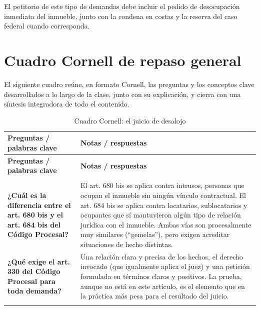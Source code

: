 \documentclass[12pt,oneside]{book}
\begin{document}
El petitorio de este tipo de demandas debe incluir el pedido de desocupación inmediata del inmueble, junto con la condena en costas y la reserva del caso federal cuando corresponda.

\chapter{Cuadro Cornell de repaso general}

El siguiente cuadro reúne, en formato Cornell, las preguntas y los conceptos clave desarrollados a lo largo de la clase, junto con su explicación, y cierra con una síntesis integradora de todo el contenido.

\begin{longtable}{
    >{\raggedright\arraybackslash}p{}
    >{\raggedright\arraybackslash}p{}
}
\caption{Cuadro Cornell: el juicio de desalojo} \\
\toprule
\textbf{Preguntas / palabras clave} & \textbf{Notas / respuestas} \\
\midrule
\endfirsthead

\toprule
\textbf{Preguntas / palabras clave} & \textbf{Notas / respuestas} \\
\midrule
\endhead

\midrule
\multicolumn{2}{r}{\textit{Continúa en la página siguiente}} \\
\endfoot

\bottomrule
\endlastfoot

\textbf{¿Cuál es la diferencia entre el art. 680 bis y el art. 684 bis del Código Procesal?} &
El art. 680 bis se aplica contra intrusos, personas que ocupan el inmueble sin ningún vínculo contractual. El art. 684 bis se aplica contra locatarios, sublocatarios y ocupantes que sí mantuvieron algún tipo de relación jurídica con el inmueble. Ambas vías son procesalmente muy similares (``gemelas''), pero exigen acreditar situaciones de hecho distintas. \\
\addlinespace

\textbf{¿Qué exige el art. 330 del Código Procesal para toda demanda?} &
Una relación clara y precisa de los hechos, el derecho invocado (que igualmente aplica el juez) y una petición formulada en términos claros y positivos. La prueba, aunque no está en este artículo, es el elemento que en la práctica más pesa para el resultado del juicio. \\
\addlinespace


\end{longtable}
\end{document}
